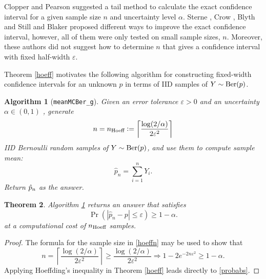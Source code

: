 \documentclass{iitthesis}
\newtheorem{theorem}{Theorem}[section]
\newtheorem{algorithm}[theorem]{Algorithm}
\begin{document}
Clopper and Pearson \cite{CP34} suggested a tail method to calculate the exact confidence interval for a given sample size $n$ and uncertainty level $\alpha$. Sterne \cite{sterne54}, Crow \cite{crow56}, Blyth and Still \cite{BS83} and Blaker \cite{Blaker00} proposed different ways to improve the exact confidence interval, however, all of them were only tested on small sample sizes, $n$.  Moreover, these authors did not suggest how to determine $n$ that gives a confidence interval with fixed half-width $\varepsilon$. 

Theorem \ref{hoeff} motivates the following algorithm for constructing fixed-width confidence intervals for an unknown $p$ in terms of IID samples of $Y\sim \operatorname{Ber}(p)$.
\begin{algorithm}[{\tt meanMCBer\_g}]\label{algabs}
Given an error tolerance $\varepsilon > 0$ and an uncertainty $\alpha \in (0,1)$ , generate
\begin{equation}\label{hoeffn}
n = n_{\text{Hoeff}} := \left \lceil  \frac{\log(2/\alpha)}{2\varepsilon^2} \right \rceil
\end{equation}
IID Bernoulli random samples of $Y \sim \operatorname{Ber}(p)$, and use them to compute sample mean:
\begin{equation} \label{abserrp}
\hat{p}_n = \sum_{i =1}^n Y_i.
\end{equation}
Return $\hat{p}_n$ as the answer.
\end{algorithm}
\begin{theorem}
Algorithm \ref{algabs} returns an answer that satisfies 
\begin{equation}\label{probabs}
\Pr(|\hat{p}_n -p| \leq \varepsilon) \geq 1-\alpha.
\end{equation}
at a computational cost of $n_{\text{Hoeff}}$ samples.
\end{theorem}
\begin{proof}
The formula for the sample size in \eqref{hoeffn} may be used to show that
\begin{equation*}
n = \left \lceil \frac{\log(2/\alpha)}{2\varepsilon^2} \right \rceil \geq  \frac{\log(2/\alpha)}{2\varepsilon^2} \Rightarrow 
1- 2e^{-2n\varepsilon^2} \geq 1-\alpha.
\end{equation*}
Applying  Hoeffding's inequality in Theorem \ref{hoeff} leads directly to \eqref{probabs}. 
\end{proof}
\end{document}
